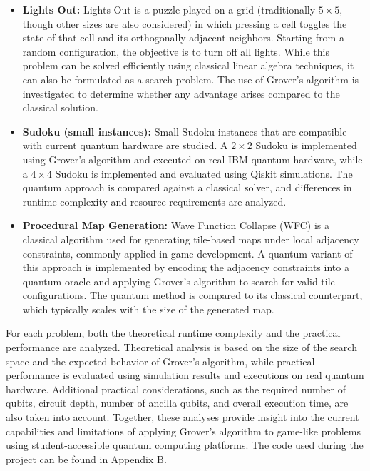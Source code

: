 \begin{itemize}
\item \textbf{Lights Out:} Lights Out is a puzzle played on a grid (traditionally $5 \times 5$, though other sizes are also considered) in which pressing a cell toggles the state of that cell and its orthogonally adjacent neighbors. Starting from a random configuration, the objective is to turn off all lights. While this problem can be solved efficiently using classical linear algebra techniques, it can also be formulated as a search problem. The use of Grover’s algorithm is investigated to determine whether any advantage arises compared to the classical solution.

\item \textbf{Sudoku (small instances):} Small Sudoku instances that are compatible with current quantum hardware are studied. A $2 \times 2$ Sudoku is implemented using Grover’s algorithm and executed on real IBM quantum hardware, while a $4 \times 4$ Sudoku is implemented and evaluated using Qiskit simulations. The quantum approach is compared against a classical solver, and differences in runtime complexity and resource requirements are analyzed.

\item \textbf{Procedural Map Generation:} Wave Function Collapse (WFC) is a classical algorithm used for generating tile-based maps under local adjacency constraints, commonly applied in game development. A quantum variant of this approach is implemented by encoding the adjacency constraints into a quantum oracle and applying Grover’s algorithm to search for valid tile configurations. The quantum method is compared to its classical counterpart, which typically scales with the size of the generated map.
\end{itemize}

\vspace{1em}
\noindent
For each problem, both the theoretical runtime complexity and the practical performance are analyzed. Theoretical analysis is based on the size of the search space and the expected behavior of Grover’s algorithm, while practical performance is evaluated using simulation results and executions on real quantum hardware. Additional practical considerations, such as the required number of qubits, circuit depth, number of ancilla qubits, and overall execution time, are also taken into account. Together, these analyses provide insight into the current capabilities and limitations of applying Grover’s algorithm to game-like problems using student-accessible quantum computing platforms. The code used during the project can be found in Appendix B.

